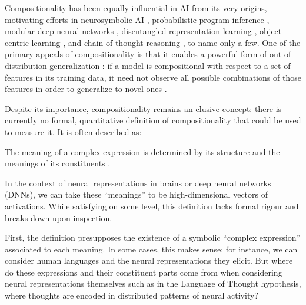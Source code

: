 \documentclass{article} %
\begin{document}
Compositionality has been equally influential in AI from its very origins, motivating efforts in neurosymbolic AI \citep{garcez2023neurosymbolic,sheth2023neurosymbolic,marcus2003algebraic}, probabilistic program inference \citep{lake2017building,ellis2003dreamcoder}, modular deep neural networks \citet{bengio2017consciousness,goyal2022inductive,pfeiffer2023modular,andreas2016neural,alias2021neural,goyal2020object,schug2024discovering}, disentangled representation learning \citep{higgins2017betavae,lachapelle2022disentanglement,ahuja2022weakly,brehmer2022weakly,lippe2022citris,sawada2018disentangling}, object-centric learning \citep{locatello2020object,singh2023neural,wu2024neural}, and chain-of-thought reasoning \citep{wei2022chain,kojima2022large,hu2024amortizing}, to name only a few. One of the primary appeals of compositionality is that it enables a powerful form of out-of-distribution generalization \citep{lake2018generalization}: if a model is compositional with respect to a set of features in its training data, it need not observe all possible combinations of those features in order to generalize to novel ones \citep{schug2024discovering,wiedemer2024provable,wiedemer2023compositional,bahdanau2018systematic,mittal2021compositional}.

Despite its importance, compositionality remains an elusive concept: there is currently no formal, quantitative definition of compositionality that could be used to measure it. It is often described as:

\begin{definition}
    \label{def:compositionality_colloquial}
    The meaning of a complex expression is determined by its structure and the meanings of its constituents \citep{sep-compositionality}.
\end{definition}

In the context of neural representations in brains or deep neural networks (DNNs), we can take these ``meanings'' to be high-dimensional vectors of activations. While satisfying on some level, this definition lacks formal rigour and breaks down upon inspection.

First, the definition presupposes the existence of a symbolic ``complex expression'' associated to each meaning. In some cases, this makes sense; for instance, we can consider human languages and the neural representations they elicit. But where do these expressions and their constituent parts come from when considering neural representations themselves such as in the Language of Thought hypothesis, where thoughts are encoded in distributed patterns of neural activity?
\end{document}
